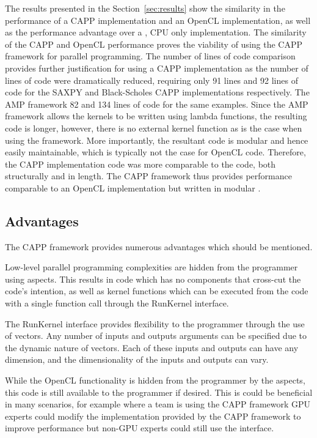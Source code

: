 \documentclass{sig-alternate-05-2015}
\begin{document}
The results presented in the Section~\ref{sec:results} show the similarity in
the performance of a CAPP implementation and an OpenCL implementation, as
well as the performance advantage over a \CPP, CPU only implementation. The
similarity of the CAPP and OpenCL performance proves the viability of
using the  CAPP framework for parallel programming. The number of lines of 
code comparison provides further justification for using a CAPP
implementation as the number of lines of \CPP code were dramatically
reduced, requiring only 91 lines and 92 lines of \CPP code for the SAXPY and
Black-Scholes CAPP implementations respectively. The \CPP AMP framework 82 and 134 lines of \CPP code for the
same examples. Since the \CPP AMP framework allows the kernels to be written using \CPP
lambda functions, the resulting \CPP code is longer, however, there is no external kernel function as is the
case when using the \CAPP framework.
More importantly, the resultant \CPP code is modular and hence easily maintainable, 
which is typically not the case for OpenCL code. Therefore,
the CAPP implementation code was more comparable to the \CPP code,
both structurally and in length. The  CAPP framework thus provides
performance comparable to an OpenCL implementation but written in modular \CPP.

\subsection{Advantages}

The  CAPP framework provides numerous advantages which should be mentioned.

Low-level parallel programming complexities are hidden from the programmer using aspects. 
This results in \CPP code which has no components that cross-cut the code's intention, as 
well as kernel functions which can be executed from the \CPP code with a single
function call through the RunKernel interface. 

The RunKernel interface provides flexibility to the programmer through the use
of vectors. Any number of inputs and outputs arguments can be specified due to
the dynamic nature of vectors. Each of these inputs and outputs can have any 
dimension, and the dimensionality of the inputs and outputs can vary.

While the OpenCL functionality is hidden from the programmer by the aspects,
this code is still available to the programmer if desired. This is could be
beneficial in many scenarios, for example where a team is using the
 CAPP framework GPU experts could modify the implementation provided by the
 CAPP framework to improve performance but non-GPU experts could still use
the \CPP interface.  
\end{document}

